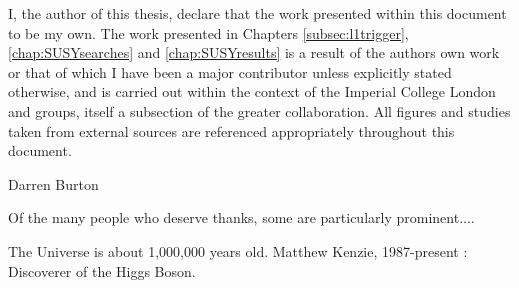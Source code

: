 
\begin{abstract}%
  \end{abstract}


\begin{declaration}
  I, the author of this thesis, declare that the work presented within this document to be my own.  The work presented in Chapters \ref{subsec:l1trigger}, \ref{chap:SUSYsearches} and \ref{chap:SUSYresults} is a result of the authors own work or that of which I have been a major contributor unless explicitly stated otherwise, and is carried out within the context of the Imperial College London and \CERN \SUSY groups, itself a subsection of the greater \CMS collaboration.  All figures and studies taken from external sources are referenced appropriately throughout this document.
  
  \vspace*{1cm}
  \begin{flushright}
    Darren Burton
  \end{flushright}
\end{declaration}


\begin{acknowledgements}
  Of the many people who deserve thanks, some are particularly prominent....
\end{acknowledgements}


\begin{preface}

  \noindent
  
\end{preface}

\tableofcontents
\listoffigures
\listoftables
\frontquote%
  {The Universe is about 1,000,000 years old.}%
  {Matthew Kenzie, 1987-present : Discoverer of the Higgs Boson.}
